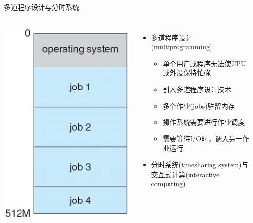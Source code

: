 \documentclass[xcolor=svgnames]{beamer}
\begin{document}
\begin{CJK*}{UTF8}{gbsn}
\begin{frame}{多道程序设计与分时系统}
\begin{columns}
\includegraphics[width=1.0\textwidth]{jobs.png}
\begin{itemize}
\item 多道程序设计(multiprogramming)
\begin{itemize}
\item 单个用户或程序无法使CPU或外设保持忙碌 
\item 引入多道程序设计技术
\item 多个作业(jobs)驻留内存
\item 操作系统需要进行作业调度
\item 需要等待I/O时，调入另一作业运行
\end{itemize}
\item 分时系统(timesharing system)与交互式计算(interactive computing)
\end{itemize}
\end{columns}
\end{frame}


\end{CJK*}
\end{document}
